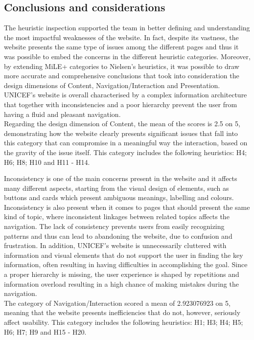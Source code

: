 
\subsection{Conclusions and considerations}

The heuristic inspection supported the team in better defining and understanding the most impactful weaknesses of the website. In fact, despite its vastness, the website presents the same type of issues among the different pages and thus it was possible to embed the concerns in the different heuristic categories. Moreover, by extending MiLE+ categories to Nielsen’s heuristics, it was possible to draw more accurate and comprehensive conclusions that took into consideration the design dimensions of Content, Navigation/Interaction and Presentation.
UNICEF’s website is overall characterised by a complex information architecture that together with inconsistencies and a poor hierarchy prevent the user from having a fluid and pleasant navigation.\\

Regarding the design dimension of Content, the mean of the scores is 2.5 on 5, demonstrating how the website clearly presents significant issues that fall into this category that can compromise in a meaningful way the interaction, based on the gravity of the issue itself. This category includes the following heuristics: H4; H6; H8; H10 and H11 - H14.

Inconsistency is one of the main concerns present in the website and it affects many different aspects, starting from the visual design of elements, such as buttons and cards which present ambiguous meanings, labelling and colours. Inconsistency is also present when it comes to pages that should present the same kind of topic, where inconsistent linkages between related topics affects the navigation. The lack of consistency prevents users from easily recognizing patterns and thus can lead to abandoning the website, due to confusion and frustration.
In addition, UNICEF's website is unnecessarily cluttered with information and visual elements that do not support the user in finding the key information, often resulting in having difficulties in accomplishing the goal. Since a proper hierarchy is missing, the user experience is shaped by repetitions and information overload resulting in a high chance of making mistakes during the navigation.\\

The category of Navigation/Interaction scored a mean of 2.923076923 on 5, meaning that the website presents inefficiencies that do not, however, seriously affect usability. This category includes the following heuristics: H1; H3; H4; H5; H6; H7; H9 and H15 - H20.

